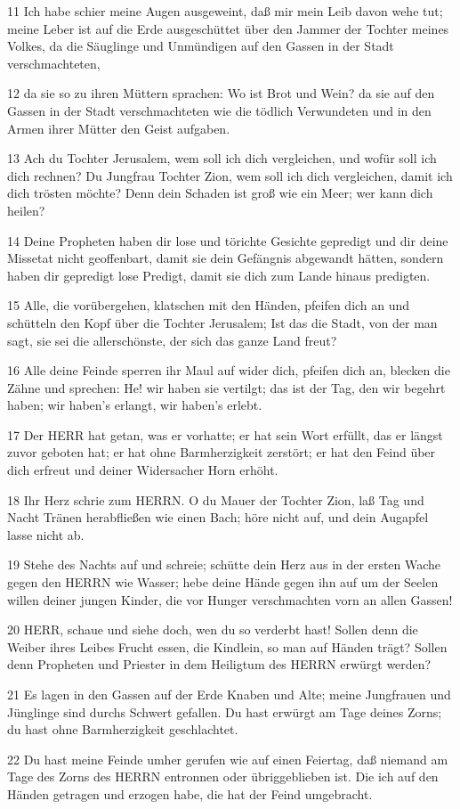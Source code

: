\par 11 Ich habe schier meine Augen ausgeweint, daß mir mein Leib davon wehe tut; meine Leber ist auf die Erde ausgeschüttet über den Jammer der Tochter meines Volkes, da die Säuglinge und Unmündigen auf den Gassen in der Stadt verschmachteten,
\par 12 da sie so zu ihren Müttern sprachen: Wo ist Brot und Wein? da sie auf den Gassen in der Stadt verschmachteten wie die tödlich Verwundeten und in den Armen ihrer Mütter den Geist aufgaben.
\par 13 Ach du Tochter Jerusalem, wem soll ich dich vergleichen, und wofür soll ich dich rechnen? Du Jungfrau Tochter Zion, wem soll ich dich vergleichen, damit ich dich trösten möchte? Denn dein Schaden ist groß wie ein Meer; wer kann dich heilen?
\par 14 Deine Propheten haben dir lose und törichte Gesichte gepredigt und dir deine Missetat nicht geoffenbart, damit sie dein Gefängnis abgewandt hätten, sondern haben dir gepredigt lose Predigt, damit sie dich zum Lande hinaus predigten.
\par 15 Alle, die vorübergehen, klatschen mit den Händen, pfeifen dich an und schütteln den Kopf über die Tochter Jerusalem; Ist das die Stadt, von der man sagt, sie sei die allerschönste, der sich das ganze Land freut?
\par 16 Alle deine Feinde sperren ihr Maul auf wider dich, pfeifen dich an, blecken die Zähne und sprechen: He! wir haben sie vertilgt; das ist der Tag, den wir begehrt haben; wir haben's erlangt, wir haben's erlebt.
\par 17 Der HERR hat getan, was er vorhatte; er hat sein Wort erfüllt, das er längst zuvor geboten hat; er hat ohne Barmherzigkeit zerstört; er hat den Feind über dich erfreut und deiner Widersacher Horn erhöht.
\par 18 Ihr Herz schrie zum HERRN. O du Mauer der Tochter Zion, laß Tag und Nacht Tränen herabfließen wie einen Bach; höre nicht auf, und dein Augapfel lasse nicht ab.
\par 19 Stehe des Nachts auf und schreie; schütte dein Herz aus in der ersten Wache gegen den HERRN wie Wasser; hebe deine Hände gegen ihn auf um der Seelen willen deiner jungen Kinder, die vor Hunger verschmachten vorn an allen Gassen!
\par 20 HERR, schaue und siehe doch, wen du so verderbt hast! Sollen denn die Weiber ihres Leibes Frucht essen, die Kindlein, so man auf Händen trägt? Sollen denn Propheten und Priester in dem Heiligtum des HERRN erwürgt werden?
\par 21 Es lagen in den Gassen auf der Erde Knaben und Alte; meine Jungfrauen und Jünglinge sind durchs Schwert gefallen. Du hast erwürgt am Tage deines Zorns; du hast ohne Barmherzigkeit geschlachtet.
\par 22 Du hast meine Feinde umher gerufen wie auf einen Feiertag, daß niemand am Tage des Zorns des HERRN entronnen oder übriggeblieben ist. Die ich auf den Händen getragen und erzogen habe, die hat der Feind umgebracht.

